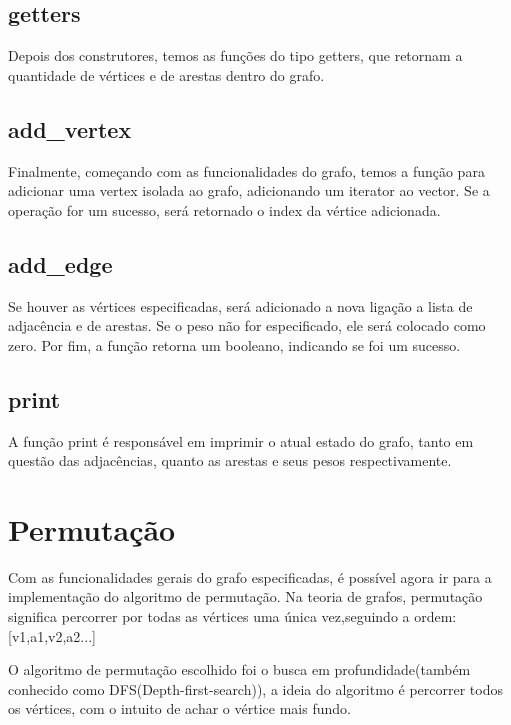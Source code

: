 \documentclass[12pt]{article}
\begin{document}
  \subsection{getters}

    Depois dos construtores, temos as funções do tipo getters, que retornam a quantidade de vértices 
    e de arestas dentro do grafo.

  \subsection{add\_vertex}

    Finalmente, começando com as funcionalidades do grafo, temos a função para adicionar 
    uma vertex isolada ao grafo, adicionando um iterator ao vector. Se a operação for um sucesso, 
    será retornado o index da vértice adicionada.

  \subsection{add\_edge}

    Se houver as vértices especificadas, será adicionado a nova ligação a lista de 
    adjacência e de arestas. Se o peso não for especificado, ele será colocado como zero.
    Por fim, a função retorna um booleano, indicando se foi um sucesso.

  \subsection{print}

    A função print é responsável em imprimir o atual estado do grafo, tanto
    em questão das adjacências, quanto as arestas e seus pesos respectivamente.

  \newpage

  \section{Permutação} \label{sec:permutation}

    Com as funcionalidades gerais do grafo especificadas, é possível agora ir para a 
    implementação do algoritmo de permutação. Na teoria de grafos, permutação significa
    percorrer por todas as vértices uma única vez,seguindo a ordem: [v1,a1,v2,a2...]

    O algoritmo de permutação escolhido foi o busca em profundidade(também conhecido 
    como DFS(Depth-first-search)), a ideia do algoritmo é percorrer todos os vértices,
    com o intuito de achar o vértice mais fundo.
    
\end{document}
